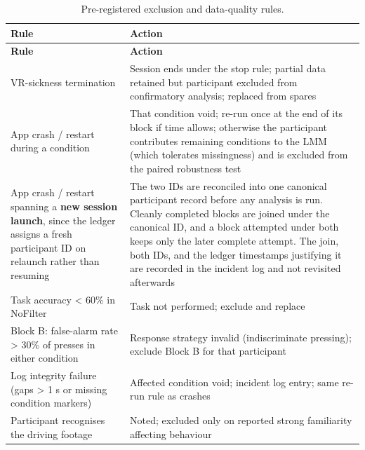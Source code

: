 \begin{longtable}{p{}|p{}}
\caption{Pre-registered exclusion and data-quality rules.}\\
\hline
\textbf{Rule} & \textbf{Action} \\
\hline
\endfirsthead
\hline
\textbf{Rule} & \textbf{Action} \\
\hline
\endhead
\hline
VR-sickness termination & Session ends under the stop rule; partial data retained but participant excluded from confirmatory analysis; replaced from spares \\
App crash / restart during a condition & That condition void; re-run once at the end of its block if time allows; otherwise the participant contributes remaining conditions to the LMM (which tolerates missingness) and is excluded from the paired robustness test \\
App crash / restart spanning a \textbf{new session launch}, since the ledger assigns a fresh participant ID on relaunch rather than resuming & The two IDs are reconciled into one canonical participant record before any analysis is run. Cleanly completed blocks are joined under the canonical ID, and a block attempted under both keeps only the later complete attempt. The join, both IDs, and the ledger timestamps justifying it are recorded in the incident log and not revisited afterwards \\
Task accuracy < 60\% in NoFilter & Task not performed; exclude and replace \\
Block B: false-alarm rate > 30\% of presses in either condition & Response strategy invalid (indiscriminate pressing); exclude Block B for that participant \\
Log integrity failure (gaps > 1 s or missing condition markers) & Affected condition void; incident log entry; same re-run rule as crashes \\
Participant recognises the driving footage & Noted; excluded only on reported strong familiarity affecting behaviour \\
\hline
\end{longtable}
